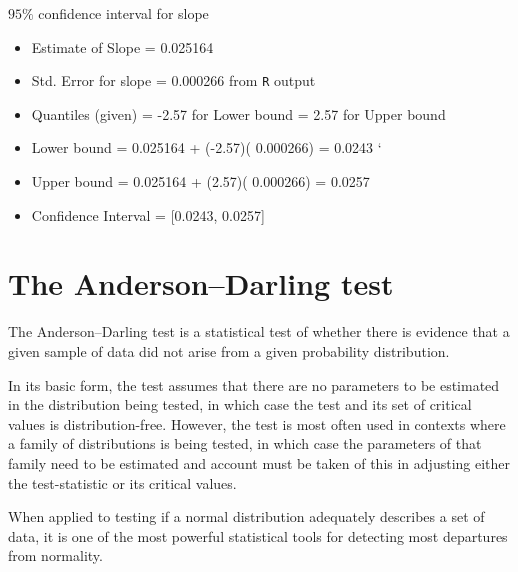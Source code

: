 \documentclass[12pt, a4paper]{report}
\theoremstyle{plain}
\theoremstyle{definition}
\theoremstyle{remark}
\begin{document}
$95\%$ confidence interval for slope
\begin{itemize}
\item Estimate of Slope     = 	0.025164
\item Std. Error for slope 	= 	0.000266 from \texttt{R} output
\item Quantiles (given) 	=	-2.57 	for Lower bound
				            =   2.57  	for Upper bound

\item Lower bound		=	0.025164 + (-2.57)( 0.000266)
				=	0.0243
`
\item Upper bound		=	0.025164 + (2.57)( 0.000266)
				=	0.0257

\item Confidence Interval = [0.0243, 0.0257]
\end{itemize}





\section{The Anderson–Darling test}

The Anderson–Darling test is a statistical test of whether there is evidence that a given sample of data did not arise from a given probability distribution.

In its basic form, the test assumes that there are no parameters to be estimated in the distribution being tested, in which case the test and its set of critical values is distribution-free. However, the test is most often used in contexts where a family of distributions is being tested, in which case the parameters of that family need to be estimated and account must be taken of this in adjusting either the test-statistic or its critical values.

When applied to testing if a normal distribution adequately describes a set of data, it is one of the most powerful statistical tools for detecting most departures from normality.
\end{document}
